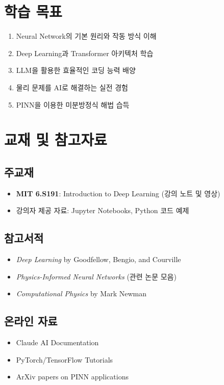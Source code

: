 \documentclass[11pt,a4paper]{article}
\begin{document}
\section{학습 목표}

\begin{enumerate}[noitemsep]
    \item Neural Network의 기본 원리와 작동 방식 이해
    \item Deep Learning과 Transformer 아키텍처 학습
    \item LLM을 활용한 효율적인 코딩 능력 배양
    \item 물리 문제를 AI로 해결하는 실전 경험
    \item PINN을 이용한 미분방정식 해법 습득
\end{enumerate}

\section{교재 및 참고자료}

\subsection{주교재}
\begin{itemize}[noitemsep]
    \item \textbf{MIT 6.S191}: Introduction to Deep Learning (강의 노트 및 영상)
    \item 강의자 제공 자료: Jupyter Notebooks, Python 코드 예제
\end{itemize}

\subsection{참고서적}
\begin{itemize}[noitemsep]
    \item \textit{Deep Learning} by Goodfellow, Bengio, and Courville
    \item \textit{Physics-Informed Neural Networks} (관련 논문 모음)
    \item \textit{Computational Physics} by Mark Newman
\end{itemize}

\subsection{온라인 자료}
\begin{itemize}[noitemsep]
    \item Claude AI Documentation
    \item PyTorch/TensorFlow Tutorials
    \item ArXiv papers on PINN applications
\end{itemize}
\end{document}
